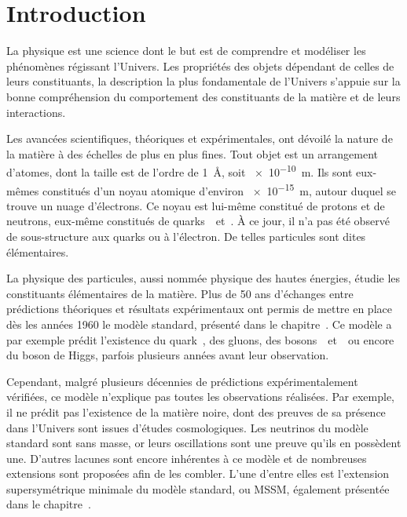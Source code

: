 \chapter*{Introduction}\label{chapter-introduction}

La physique est une science dont le but est de
comprendre et modéliser les phénomènes régissant l'Univers.
Les propriétés des objets dépendant de celles de leurs constituants,
la description la plus fondamentale de l'Univers s'appuie sur la bonne compréhension
du comportement des constituants de la matière et de leurs interactions.
\par
Les avancées scientifiques, théoriques et expérimentales,
ont dévoilé la nature de la matière à des échelles de plus en plus fines.
Tout objet est un arrangement d'atomes, dont la taille est de l'ordre de
\SI{1}{\angstrom}, soit \SI{e-10}{\meter}.
Ils sont eux-mêmes constitués d'un noyau atomique d'environ \SI{e-15}{\meter},
autour duquel se trouve un nuage d'électrons.
Ce noyau est lui-même constitué de protons et de neutrons,
eux-même constitués de quarks~\quarku\ et~\quarkd.
À ce jour, il n'a pas été observé de sous-structure aux quarks ou à l'électron.
De telles particules sont dites élémentaires.
\par
La physique des particules, aussi nommée physique des hautes énergies, étudie les constituants élémentaires de la matière.
Plus de 50 ans d'échanges entre prédictions théoriques et résultats expérimentaux
ont permis de mettre en place dès les années 1960 le modèle standard,
présenté dans le chapitre~.
Ce modèle a par exemple prédit l'existence
du quark~\quarkt,
des gluons,
des bosons~\Wboson\ et~\Zboson\
ou encore
du boson de Higgs,
parfois plusieurs années avant leur observation.
\par
Cependant,
malgré plusieurs décennies de prédictions expérimentalement vérifiées,
ce modèle n'explique pas toutes les observations réalisées.
Par exemple,
il ne prédit pas l'existence de la matière noire,
dont des preuves de sa présence dans l'Univers
sont issues d'études cosmologiques.
Les neutrinos du modèle standard sont sans masse,
or 
leurs oscillations sont une preuve qu'ils en possèdent une.
D'autres lacunes sont encore inhérentes à ce modèle
et
de nombreuses extensions sont proposées afin de les combler.
L'une d'entre elles est l'extension supersymétrique minimale du modèle standard, ou MSSM,
également présentée dans le chapitre~\refChMSSM.
